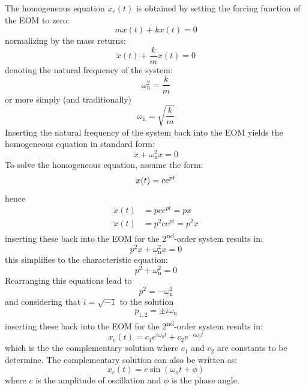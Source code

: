 \documentclass[12pt,letter]{article}
\begin{document}
The homogeneous equation $x_\text{c}(t)$ is obtained by setting the forcing function of the EOM to zero:
\begin{equation}
m \ddot{x}(t) + kx(t) = 0
\end{equation}
normalizing by the mass returns:
\begin{equation}
\ddot{x}(t) + \frac{k}{m}x(t) = 0
\end{equation}
denoting the natural frequency of the system:
\begin{equation}
\omega_\text{n}^2 = \frac{k}{m}
\end{equation}
or more simply (and traditionally)
\begin{equation}
\omega_\text{n} = \sqrt{\frac{k}{m}}
\end{equation}
Inserting the natural frequency of the system back into the EOM yields the homogeneous equation in standard form:
\begin{equation}
\ddot{x} + \omega_\text{n}^2 x = 0
\end{equation}
To solve the homogeneous equation, assume the form:
\begin{equation}
x\text(t) = c e^{ p t} 
\end{equation}
hence
\begin{align}
\dot{x}(t)&= p c e^{ p t}  = px\\
\ddot{x}(t)&= p^2 c e^{ p t} = p^2x \nonumber
\end{align}
inserting these back into the EOM for the 2\textsuperscript{nd}-order system results in:
\begin{equation}
 p^2x + \omega_\text{n}^2 x = 0
\end{equation}
this simplifies to the characteristic equation:
\begin{equation}
 p^2 + \omega_\text{n}^2 = 0
\end{equation}
Rearranging this equations lead to
\begin{equation}
 p^2  = -\omega_\text{n}^2
\end{equation}
and considering that $i=\sqrt{-1}$ to the solution
\begin{equation}
p_{1,2}  = \pm i \omega_\text{n}
\end{equation}
inserting these back into the EOM for the 2\textsuperscript{nd}-order system results in:
\begin{equation}
x_\text{c}(t) = c_1 e ^{i \omega_\text{n} t} + c_2 e ^{-i \omega_\text{n} t} 
\end{equation}
which is the the complementary solution where $c_1$ and $c_2$ are constants to be determine.  The complementary solution can also be written as:
\begin{equation}
x_c(t) = c \sin(\omega_\text{n} t + \phi) 
\end{equation}
where $c$ is the amplitude of oscillation and $\phi$ is the phase angle. 
\end{document}
